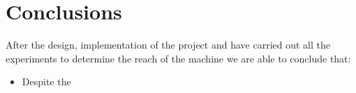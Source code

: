 \chapter{Conclusions}
\label{chap:conclusions}

	After the design, implementation of the project and have carried out all the experiments to determine the reach of the machine we are able to conclude that:
	\begin{itemize}
		\item Despite the 
	\end{itemize}